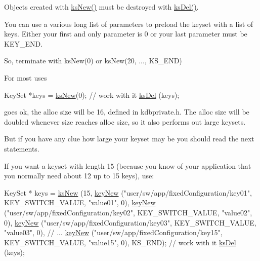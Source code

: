 Objects created with \hyperlink{group__keyset_ga671e1aaee3ae9dc13b4834a4ddbd2c3c}{ks\-New()} must be destroyed with \hyperlink{group__keyset_ga27e5c16473b02a422238c8d970db7ac8}{ks\-Del()}.

You can use a various long list of parameters to preload the keyset with a list of keys. Either your first and only parameter is 0 or your last parameter must be K\-E\-Y\-\_\-\-E\-N\-D.

So, terminate with ks\-New(0) or ks\-New(20, ..., K\-S\-\_\-\-E\-N\-D)

For most uses 
\begin{DoxyCode}
KeySet *keys = \hyperlink{group__keyset_ga671e1aaee3ae9dc13b4834a4ddbd2c3c}{ksNew}(0);
\textcolor{comment}{// work with it}
\hyperlink{group__keyset_ga27e5c16473b02a422238c8d970db7ac8}{ksDel} (keys);
\end{DoxyCode}
 goes ok, the alloc size will be 16, defined in kdbprivate.\-h. The alloc size will be doubled whenever size reaches alloc size, so it also performs out large keysets.

But if you have any clue how large your keyset may be you should read the next statements.

If you want a keyset with length 15 (because you know of your application that you normally need about 12 up to 15 keys), use\-: 
\begin{DoxyCode}
KeySet * keys = \hyperlink{group__keyset_ga671e1aaee3ae9dc13b4834a4ddbd2c3c}{ksNew} (15,
        \hyperlink{group__key_gaf6893c038b3ebee90c73a9ea8356bebf}{keyNew} (\textcolor{stringliteral}{"user/sw/app/fixedConfiguration/key01"}, KEY\_SWITCH\_VALUE,
       \textcolor{stringliteral}{"value01"}, 0),
        \hyperlink{group__key_gaf6893c038b3ebee90c73a9ea8356bebf}{keyNew} (\textcolor{stringliteral}{"user/sw/app/fixedConfiguration/key02"}, KEY\_SWITCH\_VALUE,
       \textcolor{stringliteral}{"value02"}, 0),
        \hyperlink{group__key_gaf6893c038b3ebee90c73a9ea8356bebf}{keyNew} (\textcolor{stringliteral}{"user/sw/app/fixedConfiguration/key03"}, KEY\_SWITCH\_VALUE,
       \textcolor{stringliteral}{"value03"}, 0),
        \textcolor{comment}{// ...}
        \hyperlink{group__key_gaf6893c038b3ebee90c73a9ea8356bebf}{keyNew} (\textcolor{stringliteral}{"user/sw/app/fixedConfiguration/key15"}, KEY\_SWITCH\_VALUE,
       \textcolor{stringliteral}{"value15"}, 0),
        KS\_END);
\textcolor{comment}{// work with it}
\hyperlink{group__keyset_ga27e5c16473b02a422238c8d970db7ac8}{ksDel} (keys);
\end{DoxyCode}


